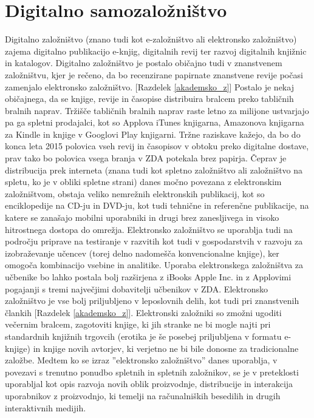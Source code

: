 \documentclass[a4paper, 12pt]{book}
\begin{document}
\chapter{Digitalno samozaložništvo}
\label{Dig_samozaloznistvo}
Digitalno založništvo (znano tudi kot e-založništvo ali elektronsko založništvo) zajema digitalno publikacijo e-knjig, digitalnih revij ter razvoj digitalnih knjiž\-nic in katalogov. Digitalno založništvo je postalo običajno tudi v znanstvenem založništvu, kjer je rečeno, da bo recenzirane papirnate znanstvene revije počasi zamenjalo elektronsko založništvo. [Razdelek \ref{akademsko_z}] Postalo je nekaj običajnega, da se knjige, revije in časopise distribuira bralcem preko tabličnih bralnih naprav. Tržišče tabličnih bralnih naprav raste letno za milijone ustvarjajo pa ga spletni prodajalci, kot so Applova iTunes knjigarna, Amazonova knjigarna za Kindle in knjige v Googlovi Play knjigarni.\cite{1} Tržne raziskave kažejo, da bo do konca leta 2015 polovica vseh revij in časopisov v obtoku preko digitalne dostave,\cite{2} prav tako bo polovica vsega branja v ZDA potekala brez papirja.\cite{3} Čeprav je distribucija prek interneta (znana tudi kot spletno založništvo ali založništvo na spletu, ko je v obliki spletne strani) danes močno povezana z elektronskim založništvom, obstaja veliko nemrežnih elektronskih publikacij, kot so enciklopedije na CD-ju in DVD-ju, kot tudi tehnične in referenčne publikacije, na katere se zanašajo mobilni uporabniki in drugi brez zanesljivega in visoko hitrostnega dostopa do omrežja. Elektronsko založništvo se uporablja tudi na področju priprave na testiranje v razvitih kot tudi v gospodarstvih v razvoju za izobraževanje učencev (torej delno nadomešča konvencionalne knjige), ker omogoča kombinacijo vsebine in analitike. Uporaba elektronskega založništva za učbenike bo lahko postala bolj razširjena z iBooks Apple Inc. in z Applovimi pogajanji s tremi največjimi dobavitelji učbenikov v ZDA.\cite{4} Elektronsko založništvo je vse bolj priljubljeno v leposlovnih delih, kot tudi pri znanstvenih člankih [Razdelek \ref{akademsko_z}]. Elektronski založniki so zmožni ugoditi večernim bralcem, zagotoviti knjige, ki jih stranke ne bi mogle najti pri standardnih knjižnih trgovcih (erotika je še posebej priljubljena v formatu e-knjige) \cite{101} in knjige novih avtorjev, ki verjetno ne bi bile donosne za tradicionalne založbe. Medtem ko se izraz ''elektronsko založništvo'' danes uporablja, v povezavi s trenutno ponudbo spletnih in spletnih založnikov, se je v preteklosti uporabljal kot opis razvoja novih oblik proizvodnje, distribucije in interakcija uporabnikov z proizvodnjo, ki temelji na računalniških besedilih in drugih interaktivnih medijih. \cite{100}
\end{document}
